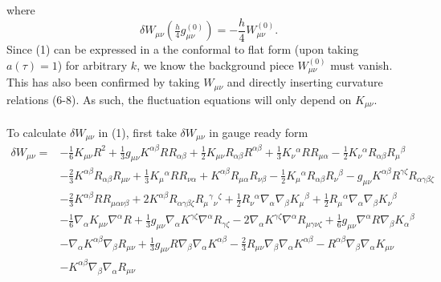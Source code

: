 \documentclass[10pt,letterpaper]{article}
\begin{document}
where
\begin{equation}
	\delta W_{\mu\nu}(\tfrac h4 g_{\mu\nu}^{(0)}) = -\frac{h}{4}W_{\mu\nu}^{(0)}.
\end{equation}
Since (1) can be expressed in a the conformal to flat form (upon taking $a(\tau)=1$) for arbitrary $k$, we know the background piece $W_{\mu\nu}^{(0)}$ must vanish. This has also been confirmed by taking $W_{\mu\nu}$ and directly inserting curvature relations (6-8). As such, the fluctuation equations will only depend on $K_{\mu\nu}$. \\ \\
To calculate $\delta W_{\mu\nu}$ in (1), first take $\delta W_{\mu\nu}$ in gauge ready form 
\begin{align}
\delta W_{\mu\nu}={}&- \tfrac{1}{6} K_{\mu \nu} R^2
 + \tfrac{1}{3} g_{\mu \nu} K^{\alpha \beta} R R_{\alpha \beta}
 + \tfrac{1}{2} K_{\mu \nu} R_{\alpha \beta} R^{\alpha \beta}
 + \tfrac{1}{3} K_{\nu}{}^{\alpha} R R_{\mu \alpha}
 -  \tfrac{1}{2} K_{\nu}{}^{\alpha} R_{\alpha \beta} R_{\mu}{}^{\beta}\nonumber\\
& -  \tfrac{2}{3} K^{\alpha \beta} R_{\alpha \beta} R_{\mu \nu}
 + \tfrac{1}{3} K_{\mu}{}^{\alpha} R R_{\nu \alpha}
 + K^{\alpha \beta} R_{\mu \alpha} R_{\nu \beta}
 -  \tfrac{1}{2} K_{\mu}{}^{\alpha} R_{\alpha \beta} R_{\nu}{}^{\beta}
 -  g_{\mu \nu} K^{\alpha \beta} R^{\gamma \zeta} R_{\alpha \gamma \beta \zeta}\nonumber\\
& -  \tfrac{2}{3} K^{\alpha \beta} R R_{\mu \alpha \nu \beta}
 + 2 K^{\alpha \beta} R_{\alpha \gamma \beta \zeta} R_{\mu}{}^{\gamma}{}_{\nu}{}^{\zeta}
 + \tfrac{1}{2} R_{\nu}{}^{\alpha} \nabla_{\alpha}\nabla_{\beta}K_{\mu}{}^{\beta}
 + \tfrac{1}{2} R_{\mu}{}^{\alpha} \nabla_{\alpha}\nabla_{\beta}K_{\nu}{}^{\beta}\nonumber\\
& -  \tfrac{1}{6} \nabla_{\alpha}K_{\mu \nu} \nabla^{\alpha}R
 + \tfrac{1}{3} g_{\mu \nu} \nabla_{\alpha}K^{\gamma \zeta} \nabla^{\alpha}R_{\gamma \zeta}
 - 2 \nabla_{\alpha}K^{\gamma \zeta} \nabla^{\alpha}R_{\mu \gamma \nu \zeta}
 + \tfrac{1}{6} g_{\mu \nu} \nabla^{\alpha}R \nabla_{\beta}K_{\alpha}{}^{\beta}\nonumber\\
& -  \nabla_{\alpha}K^{\alpha \beta} \nabla_{\beta}R_{\mu \nu}
 + \tfrac{1}{3} g_{\mu \nu} R \nabla_{\beta}\nabla_{\alpha}K^{\alpha \beta}
 -  \tfrac{2}{3} R_{\mu \nu} \nabla_{\beta}\nabla_{\alpha}K^{\alpha \beta}
 -  R^{\alpha \beta} \nabla_{\beta}\nabla_{\alpha}K_{\mu \nu}\nonumber\\
& -  K^{\alpha \beta} \nabla_{\beta}\nabla_{\alpha}R_{\mu \nu}

\end{align}
\end{document}
